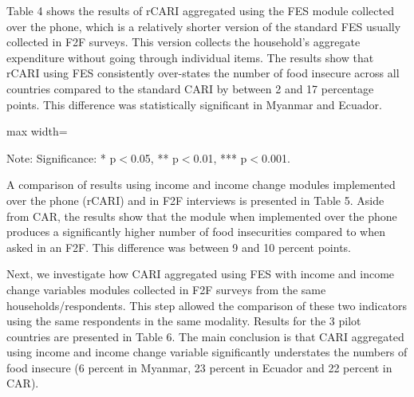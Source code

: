 \documentclass[11pt,harvard]{article}
\begin{document}
	Table 4 shows the results of rCARI aggregated using the FES module collected over the phone, which is a relatively shorter version of the standard FES usually collected in F2F surveys. This version collects the household's aggregate expenditure without going through individual items. 
	The results show that rCARI using FES consistently over-states the number of food insecure across all countries compared to the standard CARI by between 2 and 17 percentage points. This difference was statistically significant in Myanmar and Ecuador.
	
	\begin{table}[htbp]
		\centering
		\begin{adjustbox}{max width=\textwidth}
			\begin{threeparttable}
				\caption{Impact of Survey Modality: CARI-Inc vs. rCARI-Inc}
				\scriptsize
				 
				\label{tab:Inc_CARI_rCARI_Modality_All_Country}
				\begin{tablenotes}
					\item Note: Significance: * p$<$0.05, ** p$<$0.01, *** p$<$0.001. 
				\end{tablenotes}
			\end{threeparttable}
		\end{adjustbox}
	\end{table}
	
	A comparison of results using income and income change modules implemented over the phone (rCARI) and in F2F interviews is presented in Table 5. Aside from CAR, the results show that the module when implemented over the phone produces a significantly higher number of food insecurities compared to when asked in an F2F. This difference was between 9 and 10 percent points. 
	
	Next, we investigate how CARI aggregated using FES with income and income change variables modules collected in F2F surveys from the same households/respondents. This step allowed the comparison of these two indicators using the same respondents in the same modality. Results for the 3 pilot countries are presented in Table 6. The main conclusion is that CARI aggregated using income and income change variable significantly understates the numbers of food insecure (6 percent in Myanmar, 23 percent in Ecuador and 22 percent in CAR).
	
\end{document}
